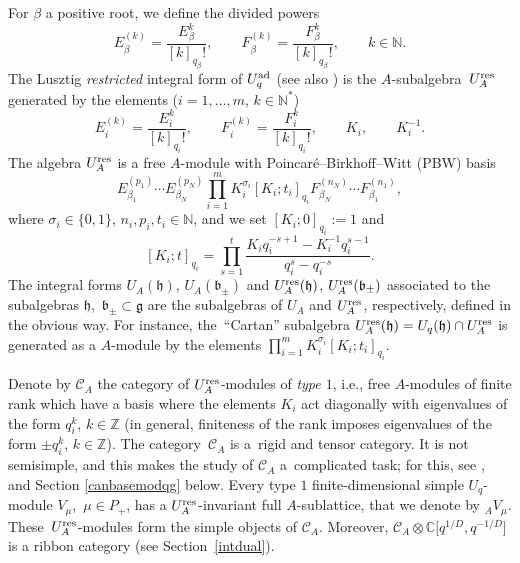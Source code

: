 \documentclass[pdftex]{sigma}
\numberwithin{equation}{section}
\theoremstyle{definition}
\newcommand{\mc}{\mathbb{C}}
\newcommand{\mz}{\mathbb{Z}}
\newcommand{\mn}{\mathbb{N}}
\begin{document}
For $\beta$ a positive root, we define the divided powers
\[E_{\beta}^{(k)} = \frac{E_\beta^k}{[k]_{q_\beta}!} , \qquad F_{\beta}^{(k)} = \frac{F_\beta^k}{[k]_{q_\beta}!}, \qquad k\in \mn.\]
The Lusztig {\it restricted} integral form of $U_q^{\rm ad}$ \cite{Lusztig2,Lusztig} (see also \cite[Chapter 9.3]{CP}) is the $A$-sub\-algebra~$U_A^{\rm res}$ generated by the elements ($i=1,\dots,m$, $k\in \mn^*$)
\[E_i^{(k)}= \frac{E_i^k}{[k]_{q_i}!},\qquad F_i^{(k)}= \frac{F_i^k}{[k]_{q_i}!} ,\qquad K_i ,\qquad K_i^{-1}.\]
The algebra $U_A^{\rm res}$ is a free $A$-module with Poincar\'e--Birkhoff--Witt (PBW) basis
\[%
E_{\beta_1}^{(p_1)}\cdots E_{\beta_N}^{(p_N)}\prod_{i=1}^m K_i^{\sigma_i}[ K_i; t_i]_{q_i} F_{\beta_N}^{(n_N)}\cdots F_{\beta_1}^{(n_1)},
\]
where $\sigma_i\in \{0,1\}$, $n_i,p_i, t_i\in \mn$, and we set $[ K_i; 0]_{q_i}:=1$ and
\[[ K_i; t ]_{q_i}= \prod_{s=1}^t \frac{K_iq_i^{-s+1}-K_i^{-1}q_i^{s-1}}{q_i^s-q_i^{-s}}.\]
The integral forms $U_A(\mathfrak{h})$, $U_A(\mathfrak{b}_\pm)$ and $U_A^{\rm res}(\mathfrak{h})$, $U_A^{\rm res}(\mathfrak{b}_\pm)$ associated to the subalgebras $\mathfrak{h}$,~$\mathfrak{b}_\pm \subset \mathfrak{g}$ are the subalgebras of $U_A$ and $U_A^{\rm res}$, respectively, defined in the obvious way. For instance, the~``Cartan'' subalgebra $U_A^{\rm res}(\mathfrak{h}) = U_q(\mathfrak{h})\cap U_A^{\rm res}$ is generated as a $A$-module by the elements $\prod_{i=1}^m K_i^{\sigma_i}[ K_i; t_i]_{q_i}$.

Denote by $\mathcal{C}_A$ the category of $U_A^{\rm res}$-modules of {\it type $1$}, i.e., free $A$-modules of finite rank which have a basis where the elements $K_i$ act diagonally with eigenvalues of the form $q_i^k$, $k\in \mz$ (in general, finiteness of the rank imposes eigenvalues of the form $\pm q_i^k$, $k\in \mz$). The category~$\mathcal{C}_A$ is a~rigid and tensor category. It is not semisimple, and this makes the study of $\mathcal{C}_A$ a~complicated task; for this, see \cite{BR}, and Section \ref{canbasemodqg} below. Every type $1$ finite-dimensional simple $U_q$-module $V_\mu$,~$\mu \in P_+$, has a $U_A^{\rm res}$-invariant full $A$-sublattice, that we denote by ${}_AV_\mu$. These~$U_A^{\rm res}$-modules form the simple objects of $\mathcal{C}_A$. Moreover, $\mathcal{C}_A \otimes \mc\big[q^{1/D},q^{-1/D}\big]$ is a ribbon category (see Section~\ref{intdual}).
\end{document}

